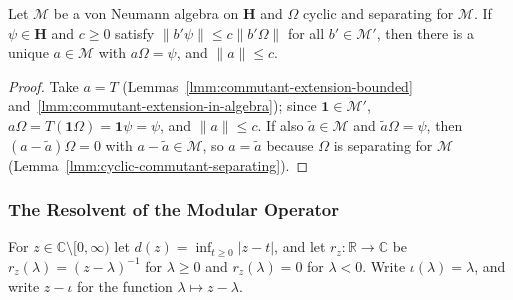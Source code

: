 \begin{lemma}
    \label{lmm:commutant-extension}
    \leanok
    Let $\mathcal{M}$ be a von Neumann algebra on $\mathbf{H}$ and $\Omega$ cyclic and separating for $\mathcal{M}$. If $\psi \in \mathbf{H}$ and $c \ge 0$ satisfy $\|b'\psi\| \le c\|b'\Omega\|$ for all $b' \in \mathcal{M}'$, then there is a unique $a \in \mathcal{M}$ with $a\Omega = \psi$, and $\|a\| \le c$.
\end{lemma}
\begin{proof}
    \leanok
    Take $a = T$ (Lemmas~\ref{lmm:commutant-extension-bounded} and~\ref{lmm:commutant-extension-in-algebra}); since $\mathbf{1} \in \mathcal{M}'$, $a\Omega = T(\mathbf{1}\Omega) = \mathbf{1}\psi = \psi$, and $\|a\| \le c$. If also $\tilde{a} \in \mathcal{M}$ and $\tilde{a}\Omega = \psi$, then $(a - \tilde{a})\Omega = 0$ with $a - \tilde{a} \in \mathcal{M}$, so $a = \tilde{a}$ because $\Omega$ is separating for $\mathcal{M}$ (Lemma~\ref{lmm:cyclic-commutant-separating}).
\end{proof}

\subsubsection{The Resolvent of the Modular Operator}

For $z \in \mathbb{C} \setminus [0, \infty)$ let $d(z) = \inf_{t \ge 0} |z - t|$, and let $r_z : \mathbb{R} \to \mathbb{C}$ be $r_z(\lambda) = (z - \lambda)^{-1}$ for $\lambda \ge 0$ and $r_z(\lambda) = 0$ for $\lambda < 0$. Write $\iota(\lambda) = \lambda$, and write $z - \iota$ for the function $\lambda \mapsto z - \lambda$.


